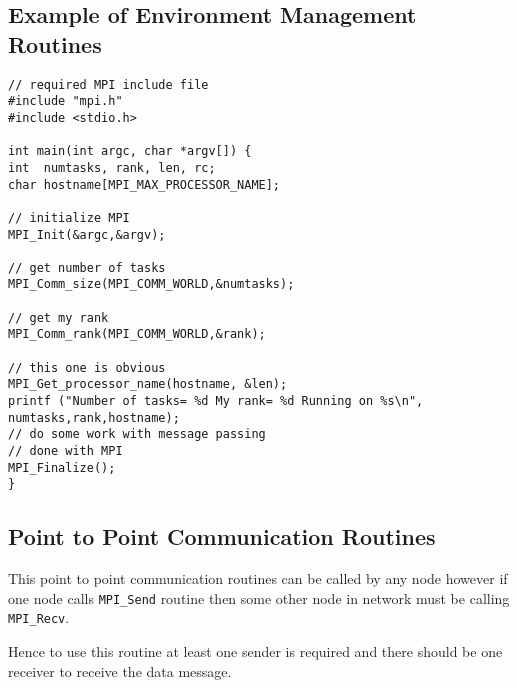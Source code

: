 \subsection*{Example of Environment Management Routines}
\begin{verbatim}
// required MPI include file  
#include "mpi.h"
#include <stdio.h>

int main(int argc, char *argv[]) {
int  numtasks, rank, len, rc; 
char hostname[MPI_MAX_PROCESSOR_NAME];

// initialize MPI  
MPI_Init(&argc,&argv);

// get number of tasks 
MPI_Comm_size(MPI_COMM_WORLD,&numtasks);

// get my rank  
MPI_Comm_rank(MPI_COMM_WORLD,&rank);

// this one is obvious  
MPI_Get_processor_name(hostname, &len);
printf ("Number of tasks= %d My rank= %d Running on %s\n", numtasks,rank,hostname);
// do some work with message passing 
// done with MPI  
MPI_Finalize();
}
\end{verbatim}

\subsection{Point to Point Communication Routines}
This point to point communication routines can be called by any node however if one node calls \verb|MPI_Send| routine then some other node in network must be calling \verb|MPI_Recv|. 

Hence to use this routine at least one sender is required and there should be one receiver to receive the data message.

